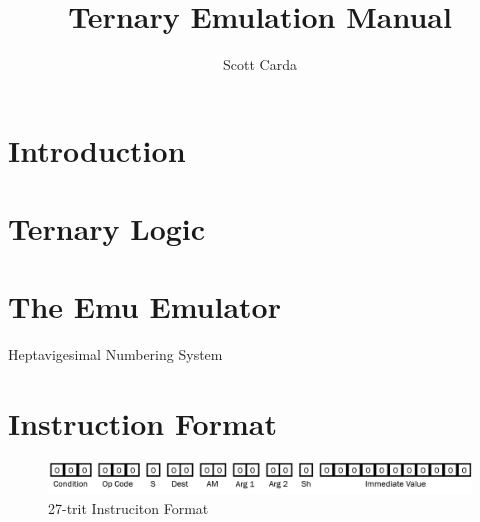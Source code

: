 \documentclass[12pt]{article}
\begin{document}


\title{Ternary Emulation Manual}
\date{}
\author{Scott Carda}

\maketitle
\newpage


\tableofcontents
\newpage


\section{Introduction} \label{sec:Intro}

\section{Ternary Logic} \label{sec:Logic}

\section{The Emu Emulator} \label{sec:Emu}

Heptavigesimal Numbering System

\section{Instruction Format} \label{sec:Format}
               
\begin{figure}[h!]
    \centering
    \includegraphics[width=\linewidth]{Resources/Instruciton_Format.png}
    \caption
    {
        27-trit Instruciton Format
    } \label{fig:Instruction Format}
\end{figure}
\end{document}
